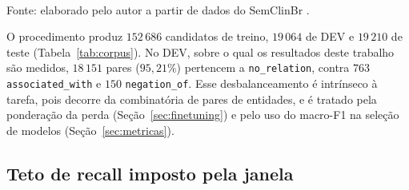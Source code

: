 \begin{quadro}[htbp]
  \centering
  \caption{Exemplo de geração de candidatos para um trecho do SemClinBr.}
  \label{quad:exemplo_candidatos}
  \\[4pt]
  {\footnotesize Fonte: elaborado pelo autor a partir de dados do SemClinBr \cite{oliveira_2022_semclinbr}.}
\end{quadro}

O procedimento produz $152\,686$ candidatos de treino, $19\,064$ de DEV e $19\,210$
de teste (Tabela~\ref{tab:corpus}). No DEV, sobre o qual os resultados deste trabalho
são medidos, $18\,151$ pares ($95{,}21\%$) pertencem a \texttt{no\_relation}, contra
$763$ \texttt{associated\_with} e $150$ \texttt{negation\_of}. Esse desbalanceamento
é intrínseco à tarefa, pois decorre da combinatória de pares de entidades, e é
tratado pela ponderação da perda (Seção~\ref{sec:finetuning}) e pelo uso do
macro-F1 na seleção de modelos (Seção~\ref{sec:metricas}).

\subsection{Teto de recall imposto pela janela}
\label{sec:teto_recall}

